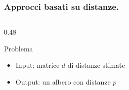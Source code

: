 \begin{frame}
        \frametitle{Approcci basati su distanze.}
        \begin{columns}
                \begin{column}{0.48\textwidth}
                        \begin{block}{Problema}
                                \begin{itemize}
                                        \item
                                              Input: matrice $d$ di distanze stimate
                                        \item
                                              Output: un albero con distanze $p$
                                \end{itemize}
                        \end{block}
                \end{column}
        \end{columns}
\end{frame}

